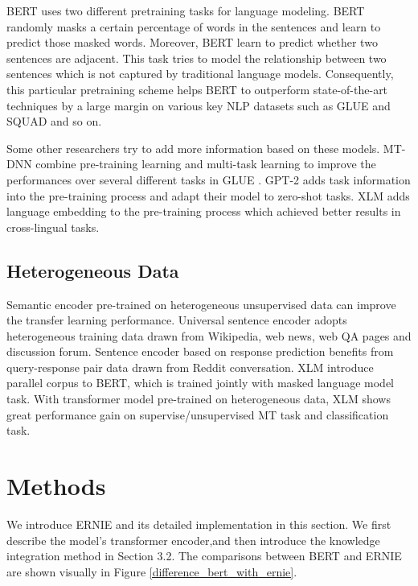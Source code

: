 \documentclass[11pt,a4paper]{article}
\begin{document}
BERT \cite{devlin2018bert} uses two different pretraining tasks for language modeling. BERT randomly masks a certain percentage of words in the sentences and learn to predict those masked words. Moreover, BERT learn to predict whether two sentences are adjacent. This task tries to model the relationship between two sentences which is not captured by traditional language models. Consequently, this particular pretraining scheme helps BERT to outperform state-of-the-art techniques by a large margin on various key NLP datasets such as GLUE \cite{wang2018glue} and SQUAD \cite{rajpurkar2016squad} and so on.

Some other researchers try to add more information based on these models. MT-DNN \cite{liu2019multi} combine pre-training learning and multi-task learning to improve the performances over several different tasks in GLUE \cite{wang2018glue}. GPT-2 \cite{radfordlanguage} adds task information into the pre-training process and adapt their model to zero-shot tasks. XLM \cite{lample2019cross} adds language embedding to the pre-training process which achieved better results in cross-lingual tasks.

\subsection{Heterogeneous Data}
Semantic encoder pre-trained on heterogeneous unsupervised data can improve the transfer learning performance. Universal sentence encoder \cite{google_use} adopts heterogeneous training data drawn from Wikipedia, web news, web QA pages and discussion forum. Sentence encoder \cite{google_smartreply} based on response prediction benefits from query-response pair data drawn from Reddit conversation. XLM \cite{lample2019cross} introduce parallel corpus to BERT, which is trained jointly with masked language model task. With transformer model pre-trained on heterogeneous data, XLM shows great performance gain on supervise/unsupervised MT task and classification task.

\section{Methods} 


We introduce ERNIE and its detailed implementation in this section. We first describe the model's transformer encoder,and then introduce the knowledge integration method in Section 3.2. The comparisons between BERT and ERNIE are shown visually in Figure \ref{difference_bert_with_ernie}.
\end{document}
